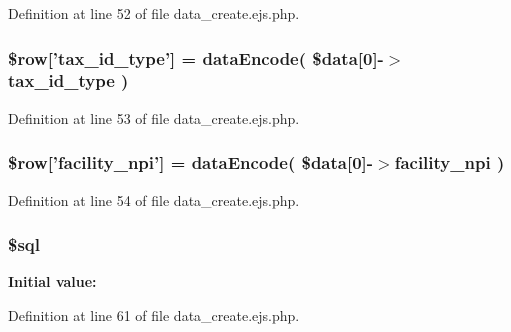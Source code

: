 \-Definition at line 52 of file data\-\_\-create.\-ejs.\-php.

\hypertarget{patientfile_2immnunization_2data__create_8ejs_8php_ad7a9a2a4679ba8036c5c2fa97dee89c4}{
\subsubsection[{\$row}]{\setlength{\rightskip}{0pt plus 5cm}\$row\mbox{[}'tax\-\_\-id\-\_\-type'\mbox{]} = {\bf data\-Encode}( \$data\mbox{[}0\mbox{]}-\/$>$tax\-\_\-id\-\_\-type )}}\label{patientfile_2immnunization_2data__create_8ejs_8php_ad7a9a2a4679ba8036c5c2fa97dee89c4}


\-Definition at line 53 of file data\-\_\-create.\-ejs.\-php.

\hypertarget{patientfile_2immnunization_2data__create_8ejs_8php_abca371c5e770b60b9b3dacacf9877173}{
\subsubsection[{\$row}]{\setlength{\rightskip}{0pt plus 5cm}\$row\mbox{[}'facility\-\_\-npi'\mbox{]} = {\bf data\-Encode}( \$data\mbox{[}0\mbox{]}-\/$>$facility\-\_\-npi )}}\label{patientfile_2immnunization_2data__create_8ejs_8php_abca371c5e770b60b9b3dacacf9877173}


\-Definition at line 54 of file data\-\_\-create.\-ejs.\-php.

\hypertarget{patientfile_2immnunization_2data__create_8ejs_8php_a047170d6020a882807665812a27e2525}{
\subsubsection[{\$sql}]{\setlength{\rightskip}{0pt plus 5cm}\$sql}}\label{patientfile_2immnunization_2data__create_8ejs_8php_a047170d6020a882807665812a27e2525}
{\bfseries \-Initial value\-:}


\-Definition at line 61 of file data\-\_\-create.\-ejs.\-php.


